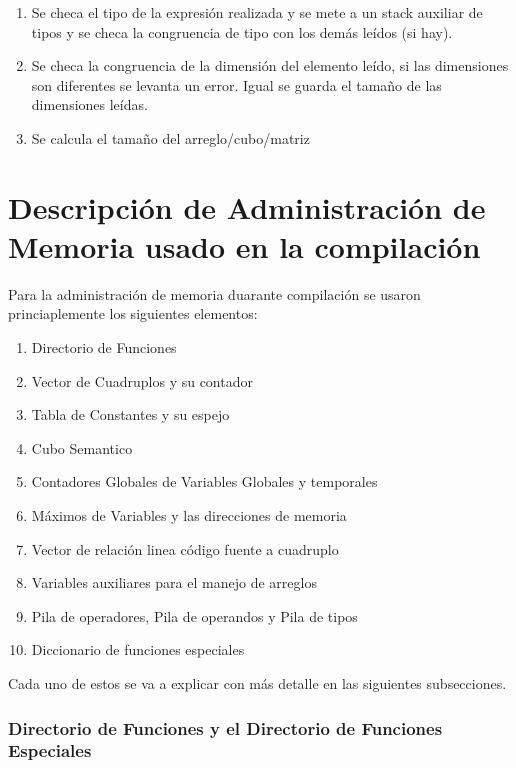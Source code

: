 \begin{enumerate}
    \item Se checa el tipo de la expresión realizada y se mete a un stack auxiliar de tipos y se checa la congruencia de tipo con los demás leídos (si hay).
    \item Se checa la congruencia de la dimensión del elemento leído, si las dimensiones son diferentes se levanta un error. Igual se guarda el tamaño de las dimensiones leídas.
    \item Se calcula el tamaño del arreglo/cubo/matriz  
    
    

\end{enumerate}
\newpage
\FloatBarrier
\section{Descripción de Administración de Memoria usado en la compilación}

Para la administración de memoria duarante compilación se usaron princiaplemente los siguientes elementos:

\begin{enumerate}

    \item Directorio de Funciones
    \item Vector de Cuadruplos y su contador
    \item Tabla de Constantes y su espejo
    \item Cubo Semantico
    \item Contadores Globales de Variables Globales y temporales
    \item Máximos de Variables y las direcciones de memoria
    \item Vector de relación linea código fuente a cuadruplo
    \item Variables auxiliares para el manejo de arreglos
    \item Pila de operadores, Pila de operandos y Pila de tipos
    \item Diccionario de funciones especiales
    
\end{enumerate}

Cada uno de estos se va a explicar con más detalle en las siguientes subsecciones.

\subsubsection{Directorio de Funciones y el Directorio de Funciones Especiales}

